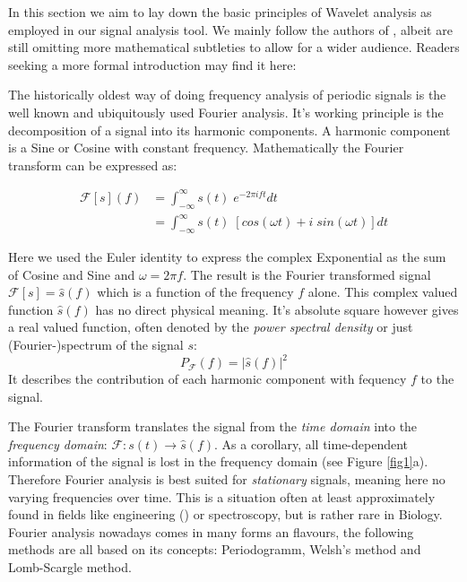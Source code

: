 In this section we aim to lay down the basic principles of Wavelet analysis as employed in our signal analysis tool. We mainly follow the authors of \cite{Torrence1998}, albeit are still omitting more mathematical subtleties to allow for a wider audience. Readers seeking a more formal introduction may find it here: \cite{Daubechies1992, Mallat1999} 

The historically oldest way of doing frequency analysis of periodic signals is the well known and ubiquitously used Fourier analysis. It's working principle is the decomposition of a signal into its harmonic components. A harmonic component is a Sine or Cosine with constant frequency. Mathematically the Fourier transform can be expressed as:

\begin{align}
  \label{Ftrafo}
  \mathcal{F}[s](f) &= \int_{-\infty}^{\infty} s(t)\;e^{-2\pi i f t} dt \\
  &= \int_{-\infty}^{\infty} s(t)\; \left[cos(\omega t) + i\;sin(\omega t) \right] dt
\end{align}

Here we used the Euler identity to express the complex Exponential as the sum of Cosine and Sine and $\omega = 2\pi f$. The result is the Fourier transformed signal $\mathcal{F}[s] = \hat{s}(f)$ which is a function of the frequency $f$ alone. 
This complex valued function $\hat{s}(f)$ has no direct physical meaning. It's absolute square however gives a real valued function, often denoted by the \textit{power spectral density} or just (Fourier-)spectrum of the signal $s$:
\begin{equation}
  P_\mathcal{F}(f) = |\hat{s}(f)|^2
\end{equation}
It describes the contribution of each harmonic component with fequency $f$ to the signal. 

The Fourier transform translates the signal from the \textit{time domain} into the \textit{frequency domain}: $\mathcal{F} : s(t) \rightarrow \hat{s}(f)$. As a corollary, all time-dependent information of the signal is lost in the frequency domain (see Figure \ref{fig1}a). Therefore Fourier analysis is best suited for \textit{stationary} signals, meaning here no varying frequencies over time. This is a situation often at least approximately found in fields like engineering (\cite{Smith1997}) or spectroscopy, but is rather rare in Biology. Fourier analysis nowadays comes in many forms an flavours, the following methods are all based on its concepts: Periodogramm, Welsh's method and Lomb-Scargle method.

